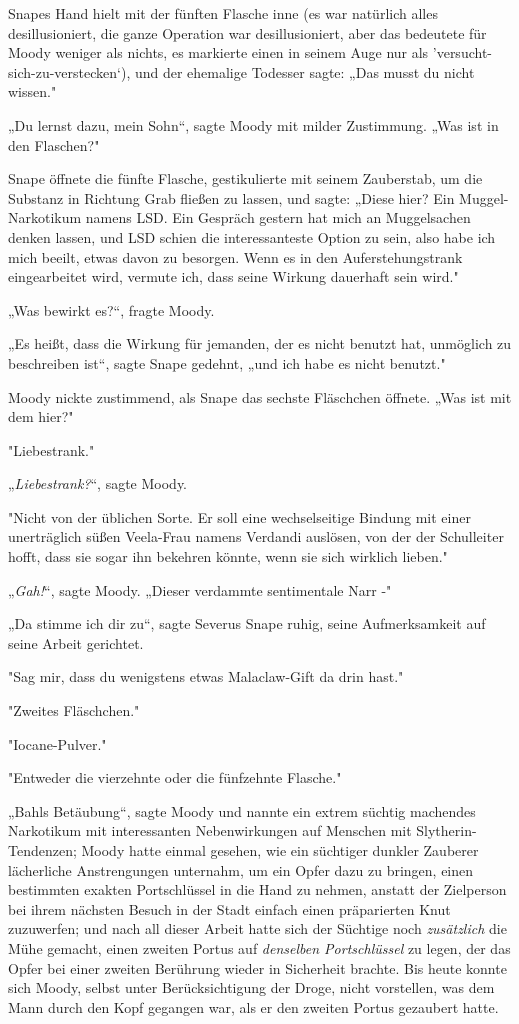 {Snapes Hand hielt mit der fünften Flasche inne (es war natürlich alles desillusioniert, die ganze Operation war desillusioniert, aber das bedeutete für Moody weniger als nichts, es markierte einen in seinem Auge nur als 'versucht-sich-zu-verstecken`), und der ehemalige Todesser sagte: „Das musst du nicht wissen."

„Du lernst dazu, mein Sohn“, sagte Moody mit milder Zustimmung. „Was ist in den Flaschen?"

Snape öffnete die fünfte Flasche, gestikulierte mit seinem Zauberstab, um die Substanz in Richtung Grab fließen zu lassen, und sagte: „Diese hier? Ein Muggel-Narkotikum namens LSD. Ein Gespräch gestern hat mich an Muggelsachen denken lassen, und LSD schien die interessanteste Option zu sein, also habe ich mich beeilt, etwas davon zu besorgen. Wenn es in den Auferstehungstrank eingearbeitet wird, vermute ich, dass seine Wirkung dauerhaft sein wird."

„Was bewirkt es?“, fragte Moody.

„Es heißt, dass die Wirkung für jemanden, der es nicht benutzt hat, unmöglich zu beschreiben ist“, sagte Snape gedehnt, „und ich habe es nicht benutzt."

Moody nickte zustimmend, als Snape das sechste Fläschchen öffnete. „Was ist mit dem hier?"

"Liebestrank."

„\emph{Liebestrank?}“, sagte Moody.

"Nicht von der üblichen Sorte. Er soll eine wechselseitige Bindung mit einer unerträglich süßen Veela-Frau namens Verdandi auslösen, von der der Schulleiter hofft, dass sie sogar ihn bekehren könnte, wenn sie sich wirklich lieben."

„\emph{Gah!}“, sagte Moody. „Dieser verdammte sentimentale Narr -"

„Da stimme ich dir zu“, sagte Severus Snape ruhig, seine Aufmerksamkeit auf seine Arbeit gerichtet.

"Sag mir, dass du wenigstens etwas Malaclaw-Gift da drin hast."

"Zweites Fläschchen."

"Iocane-Pulver."

"Entweder die vierzehnte oder die fünfzehnte Flasche."

„Bahls Betäubung“, sagte Moody und nannte ein extrem süchtig machendes Narkotikum mit interessanten Nebenwirkungen auf Menschen mit Slytherin-Tendenzen; Moody hatte einmal gesehen, wie ein süchtiger dunkler Zauberer lächerliche Anstrengungen unternahm, um ein Opfer dazu zu bringen, einen bestimmten exakten Portschlüssel in die Hand zu nehmen, anstatt der Zielperson bei ihrem nächsten Besuch in der Stadt einfach einen präparierten Knut zuzuwerfen; und nach all dieser Arbeit hatte sich der Süchtige noch \emph{zusätzlich} die Mühe gemacht, einen zweiten Portus auf \emph{denselben Portschlüssel} zu legen, der das Opfer bei einer zweiten Berührung wieder in Sicherheit brachte. Bis heute konnte sich Moody, selbst unter Berücksichtigung der Droge, nicht vorstellen, was dem Mann durch den Kopf gegangen war, als er den zweiten Portus gezaubert hatte.

}
